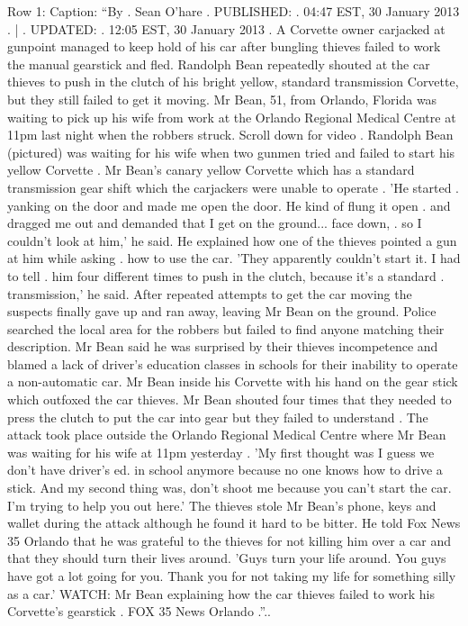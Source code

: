\begin{table}[H]
\centering
\caption{Row 1\ifshowcaption{}: Caption: ``By . Sean O'hare . PUBLISHED: . 04:47 EST, 30 January 2013 . | . UPDATED: . 12:05 EST, 30 January 2013 . A Corvette owner carjacked at gunpoint managed to keep hold of his car after bungling thieves failed to work the manual gearstick and fled. Randolph Bean repeatedly shouted at the car thieves to push in the clutch of his bright yellow, standard transmission Corvette, but they still failed to get it moving. Mr Bean, 51, from Orlando, Florida was waiting to pick up his wife from work at the Orlando Regional Medical Centre at 11pm last night when the robbers struck. Scroll down for video . Randolph Bean (pictured) was waiting for his wife when two gunmen tried and failed to start his yellow Corvette . Mr Bean's canary yellow Corvette which has a standard transmission gear shift which the carjackers were unable to operate . 'He started . yanking on the door and made me open the door. He kind of flung it open . and dragged me out and demanded that I get on the ground... face down, . so I couldn't look at him,' he said. He explained how one of the thieves pointed a gun at him while asking . how to use the car. 'They apparently couldn't start it. I had to tell . him four different times to push in the clutch, because it's a standard . transmission,' he said. After repeated attempts to get the car moving the suspects finally gave up and ran away, leaving Mr Bean on the ground. Police searched the local area for the robbers but failed to find anyone matching their description. Mr Bean said he was surprised by their thieves incompetence and blamed a lack of driver's education classes in schools for their inability to operate a non-automatic car. Mr Bean inside his Corvette with his hand on the gear stick which outfoxed the car thieves. Mr Bean shouted four times that they needed to press the clutch to put the car into gear but they failed to understand . The attack took place outside the Orlando Regional Medical Centre where Mr Bean was waiting for his wife at 11pm yesterday . 'My first thought was I guess we don't have driver's ed. in school anymore because no one knows how to drive a stick. And my second thing was, don't shoot me because you can't start the car. I'm trying to help you out here.' The thieves stole Mr Bean's phone, keys and wallet during the attack although he found it hard to be bitter. He told Fox News 35 Orlando that he was grateful to the thieves for not killing him over a car and that they should turn their lives around. 'Guys turn your life around. You guys have got a lot going for you. Thank you for not taking my life for something silly as a car.' WATCH: Mr Bean explaining how the car thieves failed to work his Corvette's gearstick . FOX 35 News Orlando .''.\else.\fi}

\end{table}
